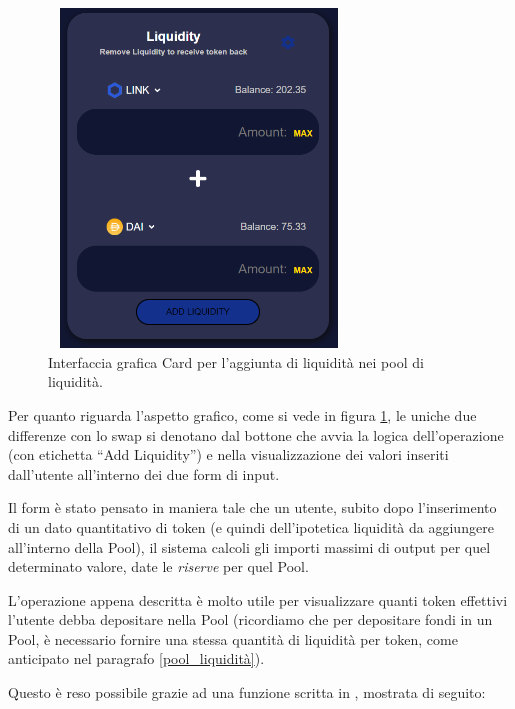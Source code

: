 \begin{figure}[h]
    \centering
    \includegraphics[width=8cm,height=9cm]{Immagini/LiquidityCard.png}
    \caption[Card per l'aggiunta di liquidità nei pool di liquidità]{Interfaccia grafica Card per l'aggiunta di liquidità nei pool di liquidità.}
    \label{liquidityCard}
\end{figure}
Per quanto riguarda l'aspetto grafico, come si vede in figura \ref{liquidityCard}, le uniche due differenze con lo swap si denotano dal bottone che avvia la logica dell'operazione (con etichetta “Add Liquidity”) e nella visualizzazione dei valori inseriti dall'utente all'interno dei due form di input.

Il form è stato pensato in maniera tale che un utente, subito dopo l'inserimento di un dato quantitativo di token (e quindi dell'ipotetica liquidità da aggiungere all'interno della Pool), il sistema calcoli gli importi massimi di output per quel determinato valore, date le \textit{riserve} per quel Pool.

L'operazione appena descritta è molto utile per visualizzare quanti token effettivi l'utente debba depositare nella Pool (ricordiamo che per depositare fondi in un Pool, è necessario fornire una stessa quantità di liquidità per token, come anticipato nel paragrafo \ref{pool_liquidità}).

Questo è reso possibile grazie ad una funzione scritta in , mostrata di seguito:

